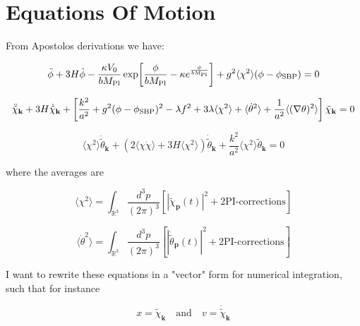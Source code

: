 \section{Equations Of Motion}

From Apostolos derivations we have:

\begin{equation}\label{phi evolution}
\ddot{\phi} + 3H \dot{\phi}
 - \frac{\kappa V_0}{b M_{\rm Pl}}
 \exp\!\left[\frac{\phi}{b M_{\rm Pl}} - \kappa e^{\frac{\phi}{b M_{\rm Pl}}}\right]
 + g^2 \langle \chi^2 \rangle (\phi - \phi_{\rm SBP}) = 0
\end{equation}

\begin{equation}\label{chi evolution}
\ddot{\tilde{\chi}}_{\mathbf{k}} + 3H \dot{\tilde{\chi}}_{\mathbf{k}}
+ \left[
\frac{k^2}{a^2}
+ g^2 (\phi - \phi_{\rm SBP})^2
- \lambda f^2
+ 3 \lambda \langle \chi^2 \rangle + \langle \dot{\theta}^2 \rangle
+ \frac{1}{a^2} \langle (\nabla \theta)^2 \rangle
\right]
\tilde{\chi}_{\mathbf{k}} = 0
\end{equation}

\begin{equation}\label{theta evolution}
\langle \chi^2 \rangle \ddot{\tilde{\theta}}_{\mathbf{k}}
+ (2 \langle \chi \dot{\chi} \rangle + 3H \langle \chi^2 \rangle) \dot{\tilde{\theta}}_{\mathbf{k}}
+ \frac{k^2}{a^2} \langle \chi^2 \rangle \tilde{\theta}_{\mathbf{k}} = 0
\end{equation}

where the averages are

\begin{equation*}
\langle \chi^2 \rangle
= \int_{\mathbb{R}^3} \frac{d^3 p}{(2\pi)^3}
\left[ |\tilde{\chi}_{\mathbf{p}}(t)|^2 + \text{2PI-corrections} \right]
\end{equation*}

\begin{equation*}
\langle \dot{\theta}^2 \rangle
= \int_{\mathbb{R}^3} \frac{d^3 p}{(2\pi)^3}
\left[ |\dot{\tilde{\theta}}_{\mathbf{p}}(t)|^2 + \text{2PI-corrections} \right]
\end{equation*}

I want to rewrite these equations in a "vector" form for numerical integration, such that for instance

\begin{equation*}
    x = \tilde{\chi}_\mathbf{k} \quad \text{and} \quad v = \dot{\tilde{\chi}}_{\mathbf{k}}
\end{equation*}

